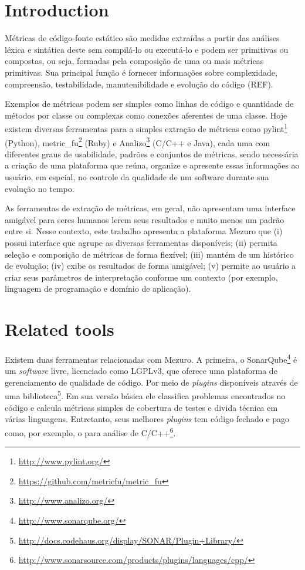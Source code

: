 \documentclass{llncs}
\begin{document}
\section{Introduction}
\label{sec:intro}

Métricas de código-fonte estático são medidas extraídas a partir das análises
léxica e sintática deste sem compilá-lo ou executá-lo e podem ser primitivas ou
compostas, ou seja, formadas pela composição de uma ou mais métricas
primitivas. Sua principal função é fornecer informações sobre complexidade,
compreensão, testabilidade, manutenibilidade e evolução do
código (REF).

Exemplos de métricas podem ser simples como linhas de código e quantidade de
métodos por classe ou complexas como conexões aferentes de uma classe.  Hoje
existem diversas ferramentas para a simples extração de métricas como
pylint\footnote{\url{http://www.pylint.org/}} (Python),
metric\_fu\footnote{\url{https://github.com/metricfu/metric_fu}} (Ruby) e
Analizo\footnote{\url{http://www.analizo.org/}} (C/C++ e Java), cada uma com
diferentes graus de usabilidade, padrões e conjuntos de métricas, sendo
necessária a criação de uma plataforma que reúna, organize e apresente essas
informações ao usuário, em espcial, no controle da qualidade de um
software durante sua evolução no tempo.

As ferramentas de extração de métricas, em geral, não apresentam uma interface
amigável para seres humanos lerem seus resultados e muito menos um padrão entre
si.  Nesse contexto, este trabalho apresenta a plataforma Mezuro que
(i) possui interface que agrupe as diversas ferramentas disponíveis;
(ii) permita seleção e composição de métricas de forma flexível;
(iii) mantém de um histórico de evolução;
(iv) exibe os resultados de forma amigável;
(v) permite ao usuário a criar seus parâmetros de interpretação conforme um
contexto (por exemplo, linguagem de programação e domínio de aplicação).

\section{Related tools}

Existem duas ferramentas relacionadas com Mezuro. A primeira, o
SonarQube\footnote{\url{http://www.sonarqube.org/}} é um \textit{software}
livre, licenciado como LGPLv3, que oferece uma plataforma de gerenciamento de
qualidade de código. Por meio de \textit{plugins} disponíveis através de uma
biblioteca\footnote{\url{http://docs.codehaus.org/display/SONAR/Plugin+Library/}}.
Em sua versão básica ele classifica problemas encontrados no código e calcula
métricas simples de cobertura de testes e divida técnica em várias linguagens.
Entretanto, seus melhores \textit{plugins} tem código fechado e pago como, por
exemplo, o para análise de
C/C++\footnote{\url{http://www.sonarsource.com/products/plugins/languages/cpp/}}.
\end{document}

